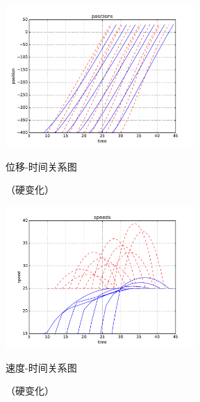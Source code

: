 \begin{figure}[htbp]
\begin{minipage}{0.48\textwidth}
  \centering
  \includegraphics[height=5.4cm]{figures/sim_case3/posi.pdf}
  \caption{位移-时间关系图}
  \caption*{\small （硬变化）}
  \label{fig:case3:posi}
\end{minipage}\hfill
\begin{minipage}{0.48\textwidth}
  \centering
  \includegraphics[height=5.4cm]{figures/sim_case3/speed.pdf}
  \caption{速度-时间关系图}
  \caption*{\small （硬变化）}
  \label{fig:case3:speed}
\end{minipage}
\end{figure}
